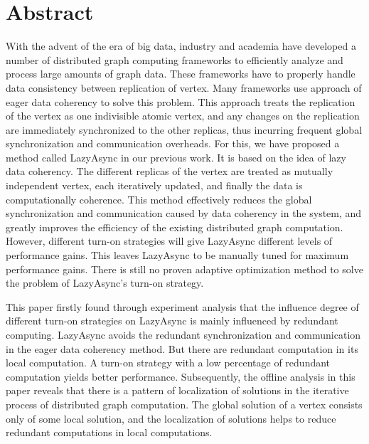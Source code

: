 \intobmk\chapter*{Abstract}%

With the advent of the era of big data, industry and academia have developed a number of distributed graph computing frameworks to efficiently analyze and process large amounts of graph data.
These frameworks have to properly handle data consistency between replication of vertex.
Many frameworks use approach of eager data coherency to solve this problem.
This approach treats the replication of the vertex as one indivisible atomic vertex, 
and any changes on the replication are immediately synchronized to the other replicas, 
thus incurring frequent global synchronization and communication overheads.
For this, we have proposed a method called LazyAsync in our previous work.
It is based on the idea of lazy data coherency.
The different replicas of the vertex are treated as mutually independent vertex, 
each iteratively updated, and finally the data is computationally coherence.
This method effectively reduces the global synchronization and communication caused 
by data coherency in the system, 
and greatly improves the efficiency of the existing distributed graph computation.
However, different turn-on strategies will give LazyAsync different levels of performance gains.
This leaves LazyAsync to be manually tuned for maximum performance gains.
There is still no proven adaptive optimization method to solve the problem of LazyAsync's turn-on strategy.

This paper firstly found through experiment analysis that 
the influence degree of different turn-on strategies on LazyAsync is mainly influenced by redundant computing.
LazyAsync avoids the redundant synchronization and communication in the eager data coherency method.
But there are redundant computation in its local computation.
A turn-on strategy with a low percentage of redundant computation yields better performance.
Subsequently, the offline analysis in this paper reveals that 
there is a pattern of localization of solutions in the iterative process of distributed graph computation.
The global solution of a vertex consists only of some local solution, 
and the localization of solutions helps to reduce redundant computations in local computations.


